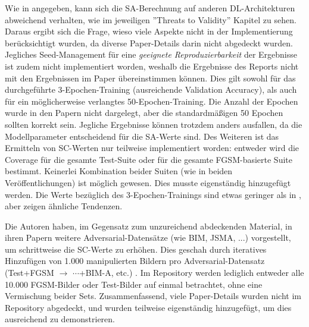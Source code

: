 \documentclass[sigconf, natbib=false]{acmart}
\begin{document}
Wie in \cite{sa_1,sa_2} angegeben, kann sich die SA-Berechnung auf anderen DL-Architekturen abweichend verhalten, wie im jeweiligen ''Threats to Validity'' Kapitel zu sehen. Daraus ergibt sich die Frage, wieso viele Aspekte nicht in der Implementierung berücksichtigt wurden, da diverse Paper-Details darin nicht abgedeckt wurden. Jegliches Seed-Management für eine \textit{geeignete Reproduzierbarkeit} der Ergebnisse ist zudem nicht implementiert worden, weshalb die Ergebnisse des Reports nicht mit den Ergebnissen im Paper übereinstimmen können. Dies gilt sowohl für das durchgeführte 3-Epochen-Training (ausreichende Validation Accuracy), als auch für ein möglicherweise verlangtes 50-Epochen-Training. Die Anzahl der Epochen wurde in den Papern nicht dargelegt, aber die standardmäßigen 50 Epochen sollten korrekt sein. Jegliche Ergebnisse können trotzdem anders ausfallen, da die Modellparameter entscheidend für die SA-Werte sind. Des Weiteren ist das Ermitteln von SC-Werten nur teilweise implementiert worden: entweder wird die Coverage für die gesamte Test-Suite oder für die gesamte FGSM-basierte Suite bestimmt. Keinerlei Kombination beider Suiten (wie in beiden Veröffentlichungen) ist möglich gewesen. Dies musste eigenständig hinzugefügt werden. Die Werte bezüglich des 3-Epochen-Trainings sind etwas geringer als in \cite{sa_1}, aber zeigen ähnliche Tendenzen.

Die Autoren haben, im Gegensatz zum unzureichend abdeckenden Material, in ihren Papern weitere Adversarial-Datensätze (wie BIM, JSMA, ...) vorgestellt, um schrittweise die SC-Werte zu erhöhen. Dies geschah durch iteratives Hinzufügen von 1.000 manipulierten Bildern pro Adversarial-Datensatz (Test+FGSM $\to$ $\cdots$+BIM-A, etc.) \cite{sa_1}. Im Repository werden lediglich entweder alle 10.000 FGSM-Bilder oder Test-Bilder auf einmal betrachtet, ohne eine Vermischung beider Sets. Zusammenfassend, viele Paper-Details wurden nicht im Repository abgedeckt, und wurden teilweise eigenständig hinzugefügt, um dies ausreichend zu demonstrieren.

\pagebreak

\printbibliography
\end{document}
